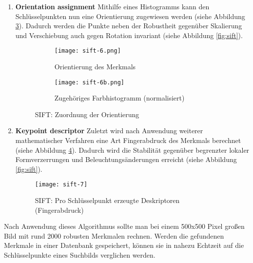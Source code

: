 \begin{enumerate}
    \item \textbf{Orientation assignment}\newline
    Mithilfe eines Histogramms kann den Schlüsselpunkten nun eine Orientierung
    zugewiesen werden (siehe Abbildung \ref{fig:sift-orientation}). Dadurch
    werden die Punkte neben der Robustheit gegenüber Skalierung und Verschiebung
    auch gegen Rotation invariant (siehe Abbildung \ref{fig:sift}).
    \parencite{sift-web-orientation}

    \begin{figure}[H]
        \centering
        \begin{subfigure}{.5\textwidth}
          \centering
          \texttt{[image: sift-6.png]}
          \caption{Orientierung des Merkmals}
          \label{fig:sift6}
        \end{subfigure}%
        \begin{subfigure}{.5\textwidth}
          \centering
          \texttt{[image: sift-6b.png]}
          \caption{Zugehöriges Farbhistogramm (normalisiert)}
          \label{fig:sift6b}
        \end{subfigure}
        \caption{SIFT: Zuordnung der Orientierung}
        \label{fig:sift-orientation}
    \end{figure}

    \item \textbf{Keypoint descriptor}\newline
    Zuletzt wird nach Anwendung weiterer mathematischer Verfahren eine Art
    Fingerabdruck des Merkmals berechnet (siehe Abbildung \ref{fig:sift7}).
    Dadurch wird die Stabilität gegenüber begrenzter lokaler Formverzerrungen
    und Beleuchtungsänderungen erreicht (siehe Abbildung \ref{fig:sift}).
    \parencite{sift-web-descriptor}

    \begin{figure}[H]
        \centering
        \texttt{[image: sift-7]}
        \caption{SIFT: Pro Schlüsselpunkt erzeugte Deskriptoren (Fingerabdruck)}
        \label{fig:sift7}
    \end{figure}
\end{enumerate}

Nach Anwendung dieses Algorithmus sollte man bei einem 500x500 Pixel großen Bild
mit rund 2000 robusten Merkmalen rechnen. Werden die gefundenen Merkmale in
einer Datenbank gespeichert, können sie in nahezu Echtzeit auf die
Schlüsselpunkte eines Suchbilds verglichen werden.
\parencite{sift-distinctive-features}

